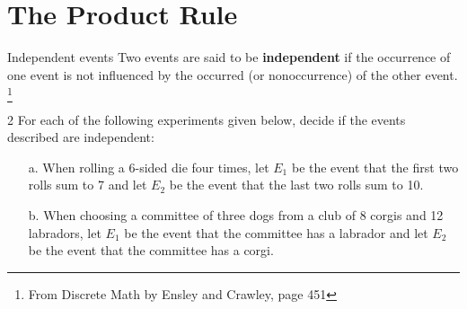 \documentclass[a4paper,12pt]{book}
\newcounter{question}
\begin{document}
    \newpage
    \section{The Product Rule}

        \begin{intro}{Independent events}
            Two events are said to be \textbf{independent} if the occurrence
            of one event is not influenced by the occurred (or nonoccurrence)
            of the other event.
            \footnote{From Discrete Math by Ensley and Crawley, page 451}
        \end{intro}


        \begin{question}{\thequestion}{2}
            For each of the following experiments given below,
            decide if the events described are independent:

            \begin{itemize}
                \item[a.] When rolling a 6-sided die four times, let $E_{1}$
                    be the event that the first two rolls sum to 7 and let $E_{2}$
                    be the event that the last two rolls sum to 10. ~\\

                \item[b.] When choosing a committee of three dogs from a club of
                    8 corgis and 12 labradors, let $E_{1}$ be the event that
                    the committee has a labrador and let $E_{2}$ be the
                    event that the committee has a corgi. ~\\

            \end{itemize}
        \end{question}
\end{document}

